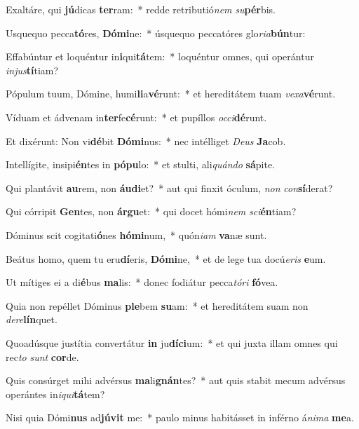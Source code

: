 \item Exaltáre, qui \textbf{jú}dicas \textbf{ter}ram:~* redde retributió\textit{nem} \textit{su}\textbf{pér}bis.
\item Usquequo pecca\textbf{tó}res, \textbf{Dó}\textbf{mi}ne:~* úsquequo peccatóres glo\textit{ri}\textit{a}\textbf{bún}tur:
\item Effabúntur et loquéntur in\textbf{i}qui\textbf{tá}tem:~* loquéntur omnes, qui operántur \textit{in}\textit{jus}\textbf{tí}tiam?
\item Pópulum tuum, Dómine, humi\textbf{li}a\textbf{vé}runt:~* et hereditátem tuam \textit{ve}\textit{xa}\textbf{vé}runt.
\item Víduam et ádvenam in\textbf{ter}fe\textbf{cé}runt:~* et pupíllos \textit{oc}\textit{ci}\textbf{dé}runt.
\item Et dixérunt: Non vi\textbf{dé}bit \textbf{Dó}\textbf{mi}nus:~* nec intélliget \textit{De}\textit{us} \textbf{Ja}cob.
\item Intellígite, insipi\textbf{én}tes in \textbf{pó}\textbf{pu}lo:~* et stulti, ali\textit{quán}\textit{do} \textbf{sá}pite.
\item Qui plantávit \textbf{au}rem, non \textbf{áu}\textbf{di}et?~* aut qui finxit óculum, \textit{non} \textit{con}\textbf{sí}derat?
\item Qui córripit \textbf{Gen}tes, non \textbf{ár}\textbf{gu}et:~* qui docet hómi\textit{nem} \textit{sci}\textbf{én}tiam?
\item Dóminus scit cogitati\textbf{ó}nes \textbf{hó}\textbf{mi}num,~* quón\textit{i}\textit{am} \textbf{va}næ sunt.
\item Beátus homo, quem tu eru\textbf{dí}eris, \textbf{Dó}\textbf{mi}ne,~* et de lege tua docú\textit{e}\textit{ris} \textbf{e}um.
\item Ut mítiges ei a di\textbf{é}bus \textbf{ma}lis:~* donec fodiátur pecca\textit{tó}\textit{ri} \textbf{fó}vea.
\item Quia non repéllet Dóminus \textbf{ple}bem \textbf{su}am:~* et hereditátem suam non \textit{de}\textit{re}\textbf{lín}quet.
\item Quoadúsque justítia convertátur \textbf{in} ju\textbf{dí}\textbf{ci}um:~* et qui juxta illam omnes qui rec\textit{to} \textit{sunt} \textbf{cor}de.
\item Quis consúrget mihi advérsus \textbf{ma}li\textbf{gnán}tes?~* aut quis stabit mecum advérsus operántes in\textit{i}\textit{qui}\textbf{tá}tem?
\item Nisi quia Dómi\textbf{nus} ad\textbf{jú}\textbf{vit} me:~* paulo minus habitásset in inférno á\textit{ni}\textit{ma} \textbf{me}a.
